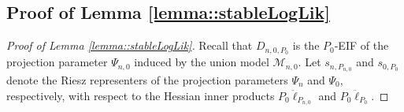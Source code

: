 \documentclass[11pt]{article}
\theoremstyle{definition}
\begin{document}
 

 

  \subsection{Proof of Lemma \ref{lemma::stableLogLik}}

\label{appendix::proofstable}
 \begin{proof}[Proof of Lemma \ref{lemma::stableLogLik}]
Recall that $D_{n,0,P_0}$ is the $P_0$-EIF of the projection parameter $\Psi_{n,0}$ induced by the union model $\mathcal{M}_{n,0}$. 
Let $s_{n,P_{n,0}}$ and $s_{0,P_{0}}$ denote the Riesz representers of the projection parameters $\Psi_n$ and $\Psi_0$, respectively, 
with respect to the Hessian inner products $P_{0}\ddot{\ell}_{P_{n,0}}$ and $P_{0}\ddot{\ell}_{P_{0}}$.



\end{proof}
\end{document}
